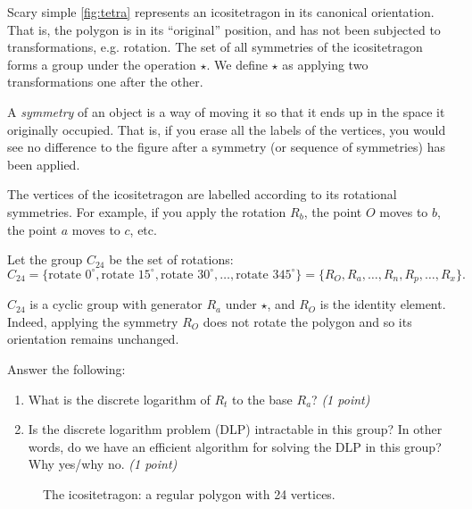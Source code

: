 \documentclass{homework}
\newcounter{ccount}
\def\nodeRot{0}
\newcommand*\poly[2][]{%
  \path (0,0) coordinate (C) [rotate/.append code={\def\nodeRot{##1}},#1]
  ++ ({angleForPoly(0,#2,0)}:x_radius and y_radius) coordinate[d] (c)
   \foreach \cnt[count=\Cnt from 0] in {1,...,#2} {
      (c) [late options={alias=c'}] (C)
      coordinate[d] (c) at ({angleForPoly(\cnt,#2,0)}:x_radius and y_radius)
      (c') edge[dashed] (c)
      \ifnum\Cnt>0 node[anchor={angleForPoly(\Cnt,#2,180+\nodeRot)},circle]
        {
          \setcounter{ccount}{\Cnt}
          \ifnum\Cnt>14\addtocounter{ccount}{1}\fi
          $\alph{ccount}$
        } \fi
   };}
\newcommand*{\polyname}{icositetragon}
\newcommand*{\polysides}{24}
\begin{document}
\begin{task}{Scary simple}
  \autoref{fig:tetra} represents an \polyname{} in its canonical orientation.
  That is, the polygon is in its \enquote{original} position, and has not been subjected to transformations, e.g. rotation.
  The set of all symmetries of the \polyname{} forms a group under the operation $\star$.
  We define $\star$ as applying two transformations one after the other.

  A \emph{symmetry} of an object is a way of moving it so that it ends up in the space it originally occupied.
  That is, if you erase all the labels of the vertices, you would see no difference to the figure after a symmetry (or sequence of symmetries) has been applied.

  The vertices of the \polyname{} are labelled according to its rotational symmetries.
  For example, if you apply the rotation $R_b$, the point $O$ moves to $b$, the point $a$ moves to $c$, etc.

  Let the group $C_{\polysides}$ be the set of rotations:
  \[
    C_{\polysides} = \{
      \text{rotate } 0^{\circ},
      \text{rotate } 15^{\circ},
      \text{rotate } 30^{\circ},
      \dots,
      \text{rotate } 345^{\circ}
    \} = \bigl\{R_O, R_a, \dots, R_n, R_p, \dots, R_x\bigr\}.
  \]

  $C_{\polysides}$ is a cyclic group with generator $R_a$ under $\star$, and $R_O$ is the identity element.
  Indeed, applying the symmetry $R_O$ does not rotate the polygon and so its orientation remains unchanged.

  Answer the following:
  \begin{enumerate}
    \item What is the discrete logarithm of $R_t$ to the base $R_a$? \textit{(1 point)}
    \item Is the discrete logarithm problem (DLP) intractable in this group?
    In other words, do we have an efficient algorithm for solving the DLP in this group?
    Why yes/why no.
    \textit{(1 point)}
  \end{enumerate}

  \begin{figure}[h]
    \centering
    \caption{The \polyname{}: a regular polygon with \polysides{} vertices.}
    \label{fig:tetra}
  \end{figure}
\end{task}
\end{document}
